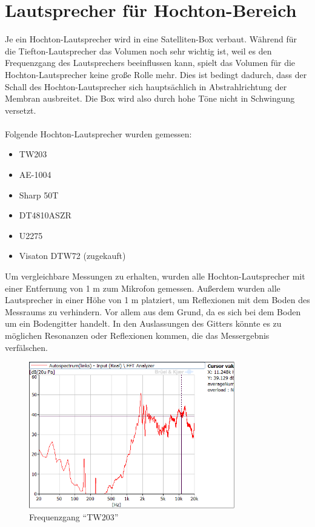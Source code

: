 
\newpage
\section{Lautsprecher für Hochton-Bereich}\label{sec:4.3}
Je ein Hochton-Lautsprecher wird in eine Satelliten-Box verbaut.
Während für die Tiefton-Lautsprecher das Volumen noch sehr wichtig ist, weil es den Frequenzgang des Lautsprechers beeinflussen kann, spielt das Volumen für die Hochton-Lautsprecher keine große Rolle mehr.
Dies ist bedingt dadurch, dass der Schall des Hochton-Lautsprecher sich hauptsächlich in Abstrahlrichtung der Membran ausbreitet.
Die Box wird also durch hohe Töne nicht in Schwingung versetzt.
\\ \\
Folgende Hochton-Lautsprecher wurden gemessen:
\begin{itemize}
	\item TW203
	\item AE-1004
	\item Sharp 50T
	\item DT4810ASZR
	\item U2275
	\item Visaton DTW72 (zugekauft)
\end{itemize}
Um vergleichbare Messungen zu erhalten, wurden alle Hochton-Lautsprecher mit einer Entfernung von 1 m zum Mikrofon gemessen.
Außerdem wurden alle Lautsprecher in einer Höhe von 1 m platziert, um Reflexionen mit dem Boden des Messraums zu verhindern.
Vor allem aus dem Grund, da es sich bei dem Boden um ein Bodengitter handelt.
In den Auslassungen des Gitters könnte es zu möglichen Resonanzen oder Reflexionen kommen, die das Messergebnis verfälschen.
\newpage

\begin{figure} [H]
	\centering
	\includegraphics[width=0.8\textwidth]{img/LSMessung/HT/TW203_1m_erhoeht.png}
	\caption{Frequenzgang \enquote{TW203}}
	\label{fig:4.3.1}
\end{figure}

